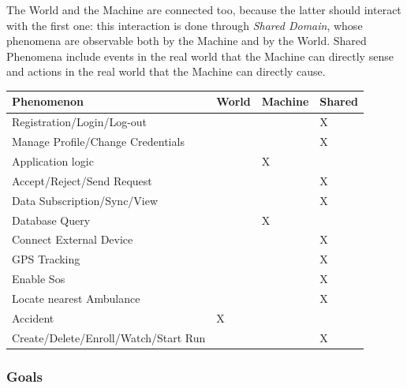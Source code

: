 \documentclass[a4paper]{article}
\begin{document}
        The World and the Machine are connected too, because the latter should interact with the first one: this interaction is done through \textit{Shared Domain}, whose phenomena are observable both by the Machine and by the World. Shared Phenomena include events in the real world that the Machine can directly sense and actions in the real world that the Machine can directly cause.
        \newpage
        \begin{table}[!htpb]
        \centering
        \begin{tabular}{|l|l|l|l|}
        \hline
         \textbf{Phenomenon} & \textbf{World} & \textbf{Machine} & \textbf{Shared}\\ \hline
         Registration/Login/Log-out & & & X \\ \hline
         Manage Profile/Change Credentials & & & X \\ \hline
         Application logic & & X & \\ \hline
         Accept/Reject/Send Request & & & X \\ \hline
         Data Subscription/Sync/View & & & X \\ \hline
         Database Query & & X & \\ \hline
         Connect External Device & & & X \\ \hline
         GPS Tracking & & & X \\ \hline
         Enable Sos & & & X \\ \hline
         Locate nearest Ambulance & & & X \\ \hline
         Accident & X & & \\ \hline
         Create/Delete/Enroll/Watch/Start Run & & & X \\ \hline
        \end{tabular}
        \end{table}
        
        \subsubsection{Goals}
        
        
        
        
        
\end{document}
